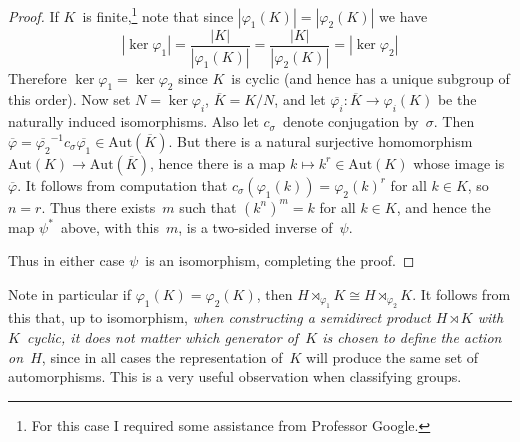 \documentclass[letterpaper]{article}
\newcommand{\iso}{\cong}
\newcommand{\aut}{\mathrm{Aut}}
\newcommand{\res}[1]{\overline{#1}}
\newcommand{\ord}[1]{|{#1}|}
\begin{document}
\begin{proof}
If $K$~is finite,\footnote{For this case I required some assistance from Professor Google.} note that since $\ord{\varphi_1(K)}=\ord{\varphi_2(K)}$ we have
$$\ord{\ker\varphi_1}=\frac{\ord{K}}{\ord{\varphi_1(K)}}=\frac{\ord{K}}{\ord{\varphi_2(K)}}=\ord{\ker\varphi_2}$$
Therefore $\ker\varphi_1=\ker\varphi_2$ since $K$~is cyclic (and hence has a unique subgroup of this order). Now set $N=\ker\varphi_i$, $\res{K}=K/N$, and let $\res{\varphi_i}:\res{K}\to\varphi_i(K)$ be the naturally induced isomorphisms. Also let $c_{\sigma}$~denote conjugation by~$\sigma$. Then $\res{\varphi}=\res{\varphi_2}^{-1}c_{\sigma}\res{\varphi_1}\in\aut(\res{K})$. But there is a natural surjective homomorphism $\aut(K)\to\aut(\res{K})$, hence there is a map $k\mapsto k^{r}\in\aut(K)$ whose image is~$\res{\varphi}$. It follows from computation that $c_{\sigma}(\varphi_1(k))=\varphi_2(k)^r$ for all $k\in K$, so $n=r$. Thus there exists~$m$ such that $(k^n)^m=k$ for all $k\in K$, and hence the map $\psi^*$~above, with this~$m$, is a two-sided inverse of~$\psi$.

Thus in either case $\psi$~is an isomorphism, completing the proof.
\end{proof}
\noindent Note in particular if $\varphi_1(K)=\varphi_2(K)$, then $H\rtimes_{\varphi_1}K\iso H\rtimes_{\varphi_2}K$. It follows from this that, up to isomorphism, \emph{when constructing a semidirect product $H\rtimes K$ with $K$~cyclic, it does not matter which generator of~$K$ is chosen to define the action on~$H$}, since in all cases the representation of~$K$ will produce the same set of automorphisms. This is a very useful observation when classifying groups.
\end{document}
